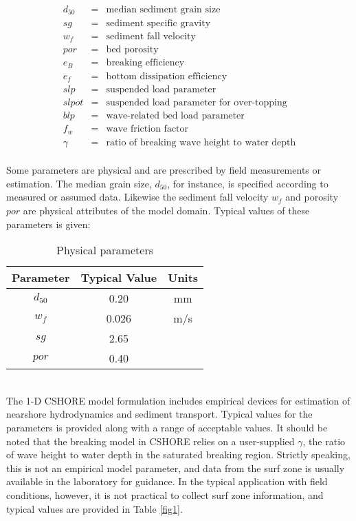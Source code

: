 \documentclass[11pt,oneside]{book}
\begin{document}
\begin{eqnarray}
d_{50} &=& \mbox{median sediment grain size }\nonumber \\
sg &=& \mbox{sediment specific gravity} \nonumber \\
w_f  &=& \mbox{sediment fall velocity}\nonumber \\
por &=& \mbox{bed porosity}\nonumber \\
e_B &=& \mbox{breaking efficiency} \nonumber \\
e_f &=& \mbox{bottom dissipation efficiency}\nonumber \\
slp &=& \mbox{suspended load parameter}\nonumber \\  
slpot &=& \mbox{suspended load parameter for over-topping}\nonumber \\  
blp &=& \mbox{wave-related bed load parameter}\nonumber \\  
f_w &=& \mbox{wave friction factor} \nonumber\\
\gamma &=& \mbox{ratio of breaking wave height to water depth} \nonumber
\end{eqnarray}
\\ Some parameters are physical and
are prescribed by field measurements or estimation.  The median grain
size, $d_{50}$, for instance, is specified according to measured or
assumed data.  Likewise the sediment fall velocity $w_f$ and porosity
$por$ are physical attributes of the model domain.  Typical values of
these parameters is given:
\begin{table}[h]
\begin{center}
\begin{tabular}{||c|c|c||}\hline
Parameter& Typical Value   & Units  \\ \hline \hline
$d_{50}$ & 0.20 & mm \\ \hline
$w_f$ & 0.026 & m/s \\ \hline
$sg$ & 2.65 &  \\ \hline
$por$ & 0.40 &  \\ \hline
\end{tabular}
\end{center}
\caption{Physical parameters}
\end{table}
\clearpage
{}\\ The 1-D CSHORE model
formulation includes empirical devices for estimation of nearshore
hydrodynamics and sediment transport.  Typical values for the
parameters is provided along with a range of acceptable values.  It
should be noted that the breaking model in CSHORE relies on a
user-supplied $\gamma$, the ratio of wave height to water depth in the
saturated breaking region.  Strictly speaking, this is not an
empirical model parameter, and data from the surf zone is usually
available in the laboratory for guidance.  In the typical application
with field conditions, however, it is not practical to collect surf
zone information, and typical values are provided in Table \ref{fig1}.
\end{document}
